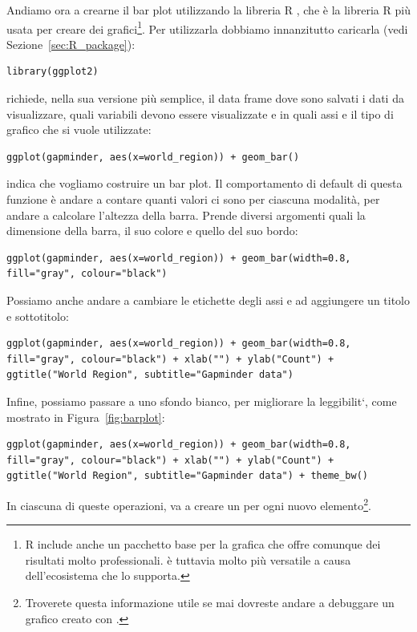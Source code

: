 \noindent Andiamo ora a crearne il bar plot utilizzando la libreria R , che \`e la libreria R pi\`u usata per creare dei grafici\footnote{R include anche un pacchetto base per la grafica che offre comunque dei risultati molto professionali.  \`e tuttavia molto pi\`u versatile a causa dell'ecosistema che lo supporta.}. Per utilizzarla dobbiamo innanzitutto caricarla (vedi Sezione~\ref{sec:R_package}):

\begin{lstlisting}[style=Rstylescript]
library(ggplot2)
\end{lstlisting}
%
 richiede, nella sua versione pi\`u semplice, il data frame dove sono salvati i dati da visualizzare, quali variabili devono essere visualizzate e in quali assi e il tipo di grafico che si vuole utilizzate:

\begin{lstlisting}[style=Rstylescript]
ggplot(gapminder, aes(x=world_region)) + geom_bar()
\end{lstlisting}
% 
 indica che vogliamo costruire un bar plot. Il comportamento di default di questa funzione \`e andare a contare quanti valori ci sono per ciascuna modalit\`a, per andare a calcolare l'altezza della barra. Prende diversi argomenti quali la dimensione della barra, il suo colore e quello del suo bordo:

\begin{lstlisting}[style=Rstylescript]
ggplot(gapminder, aes(x=world_region)) + geom_bar(width=0.8, fill="gray", colour="black")
\end{lstlisting}
%
Possiamo anche andare a cambiare le etichette degli assi e ad aggiungere un titolo e sottotitolo:

\begin{lstlisting}[style=Rstylescript]
ggplot(gapminder, aes(x=world_region)) + geom_bar(width=0.8, fill="gray", colour="black") + xlab("") + ylab("Count") + ggtitle("World Region", subtitle="Gapminder data")
\end{lstlisting}
%
Infine, possiamo passare a uno sfondo bianco, per migliorare la leggibilit\a`, come mostrato in Figura~\ref{fig:barplot}:

\begin{lstlisting}[style=Rstylescript]
ggplot(gapminder, aes(x=world_region)) + geom_bar(width=0.8, fill="gray", colour="black") + xlab("") + ylab("Count") + ggtitle("World Region", subtitle="Gapminder data") + theme_bw()
\end{lstlisting}
%
In ciascuna di queste operazioni,  va a creare un  per ogni nuovo elemento\footnote{Troverete questa informazione utile se mai dovreste andare a debuggare un grafico creato con  .}.

